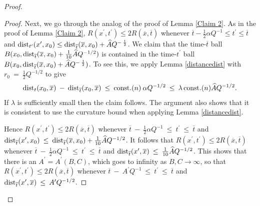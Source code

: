 \begin{proof}
\begin{proof}
Next, we go through the analog of the proof of Lemma \ref{Claim 2}.
As in the proof of Lemma \ref{Claim 2}, $R(x^\prime, t^\prime) \le 2
R(\overline{x}, \overline{t})$ whenever
$\overline{t}-\frac12 \alpha Q^{-1} \le t^\prime \le \overline{t}$
and $\operatorname{dist}_{t^\prime}(x^\prime, x_0) \le
\operatorname{dist}_{\overline{t}}(\overline{x}, x_0) + \widehat{A} Q^{- \: \frac12}$. We
claim that the time-$\overline{t}$ ball
$B(x_0, \operatorname{dist}_{\overline{t}}(\overline{x}, x_0) + \frac{1}{10} \widehat{A}
Q^{-1/2})$ is contained in the time-$t^\prime$ ball
$B(x_0, \operatorname{dist}_{\overline{t}}(\overline{x}, x_0) + \widehat{A} Q^{- \: \frac12})$.
To see this, we apply Lemma \ref{distancedist} with
$r_0 \: = \: \frac{1}{2} Q^{-1/2}$ to give
\begin{equation}
\operatorname{dist}_t(x_0, \overline{x}) \: - \:
\operatorname{dist}_{\overline{t}}(x_0, \overline{x}) \: \le \: \operatorname{const.}(n) \:
\alpha Q^{-1/2} \: \le \: \lambda \operatorname{const.}(n) \widehat{A} Q^{-1/2}.
\end{equation}
If $\lambda$ is sufficiently small then the claim follows. The argument
also shows that it is consistent to use the curvature bound when
applying Lemma \ref{distancedist}.

Hence $R(x^\prime, t^\prime) \le 2
R(\overline{x}, \overline{t})$ whenever
$\overline{t} \: - \: \frac{1}{2}  \alpha
Q^{-1} \: \le \: t^\prime \: \le \: \overline{t}$ and
$\operatorname{dist}_{\overline{t}}(x^\prime, x_0) \: \le \:
\operatorname{dist}_{\overline{t}}(\overline{x}, x_0) + \frac{1}{10} \widehat{A}
Q^{-1/2}$. It follows that
$R(x^\prime, t^\prime) \le 2
R(\overline{x}, \overline{t})$ whenever
$\overline{t} \: - \: \frac{1}{2}  \alpha
Q^{-1} \: \le \: t^\prime \: \le \: \overline{t}$ and
$\operatorname{dist}_{\overline{t}}(x^\prime, \overline{x}) \: \le \: \frac{1}{10}
\widehat{A} Q^{-1/2}$. This shows that there is an $A^\prime = A^\prime
(B, C)$, which goes
to infinity as $B, C \rightarrow \infty$, so that
$R(x^\prime, t^\prime) \le 2
R(\overline{x}, \overline{t})$ whenever
$\overline{t} \: - \: A^\prime
Q^{-1} \: \le \: t^\prime \: \le \: \overline{t}$ and
$\operatorname{dist}_{\overline{t}}(x^\prime, \overline{x}) \: \le \: A^\prime
Q^{-1/2}$.


\end{proof}
\end{proof}
